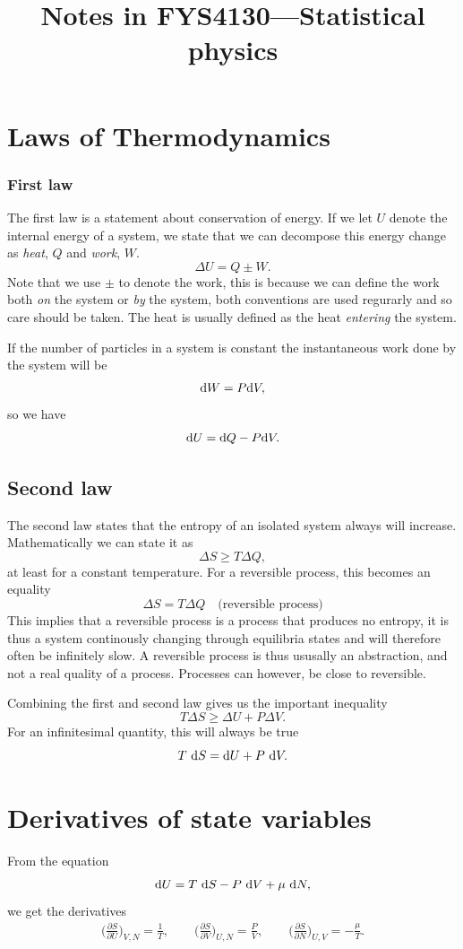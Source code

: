 \documentclass[a4paper, 11pt, notitlepage, english]{article}
\author{}
\title{Notes in FYS4130---Statistical physics}
\renewcommand{\d}{{\rm d}}
\renewcommand{\b}{\bigg}
\newcommand{\p}{\partial}
\begin{document}
\section*{Laws of Thermodynamics}

\subsubsection*{First law}
The first law is a statement about conservation of energy. If we let $U$ denote the internal energy of a system, we state that we can decompose this energy change as \emph{heat}, $Q$ and \emph{work}, $W$.
$$\Delta U = Q \pm W.$$
Note that we use $\pm$ to denote the work, this is because we can define the work both \emph{on} the system or \emph{by} the system, both conventions are used regurarly and so care should be taken. The heat is usually defined as the heat \emph{entering} the system.

If the number of particles in a system is constant the instantaneous work done by the system will be 
$$\d W = P \d V,$$
so we have
$$\d U = \d Q - P \d V.$$

\subsection*{Second law}
The second law states that the entropy of an isolated system always will increase. Mathematically we can state it as
$$\Delta S \geq T\Delta Q,$$
at least for a constant temperature. For a reversible process, this becomes an equality
$$\Delta S = T \Delta Q \quad \mbox{(reversible process)} $$
This implies that a reversible process is a process that produces no entropy, it is thus a system continously changing through equilibria states and will therefore often be 
infinitely slow. A reversible process is thus ususally an abstraction, and not a real quality of a process. Processes can however, be close to reversible.

Combining the first and second law gives us the important inequality
$$T\Delta S \geq \Delta U + P\Delta V.$$
For an infinitesimal quantity, this will always be true
$$T\ \d S = \d U + P\ \d V.$$

\section*{Derivatives of state variables}
From the equation
$$\d U = T\ \d S - P\ \d V + \mu\ \d N,$$
we get the derivatives
\begin{align*}
\b(\frac{\p S}{\p U}\b)_{V,N}=\frac{1}{T}, \qquad \b(\frac{\p S}{\p V}\b)_{U,N}=\frac{P}{V}, \qquad \b(\frac{\p S}{\p N}\b)_{U,V}=-\frac{\mu}{T}.
\end{align*}
\end{document}
